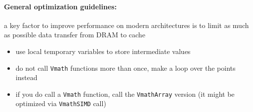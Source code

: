 \paragraph{General optimization guidelines: }
a key factor to improve performance on modern architectures is to limit as much as possible data transfer from DRAM to cache
\begin{itemize}
\item use local temporary variables to store intermediate values
\item do not call \verb+Vmath+ functions more than once, make a loop over the points instead
\item if you do call a \verb+Vmath+ function, call the \verb+VmathArray+ version (it might be optimized via \verb+VmathSIMD+ call)

\end{itemize}
